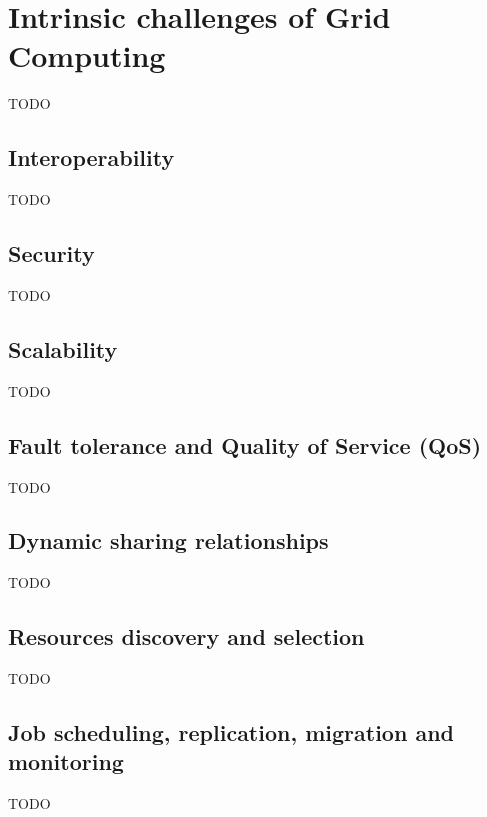 \section{Intrinsic challenges of Grid Computing}
TODO

\subsection{Interoperability}
TODO

\subsection{Security}
TODO

\subsection{Scalability}
TODO

\subsection{Fault tolerance and Quality of Service (QoS)}
TODO

\subsection{Dynamic sharing relationships}
TODO

\subsection{Resources discovery and selection}
TODO

\subsection{Job scheduling, replication, migration and monitoring}
TODO
